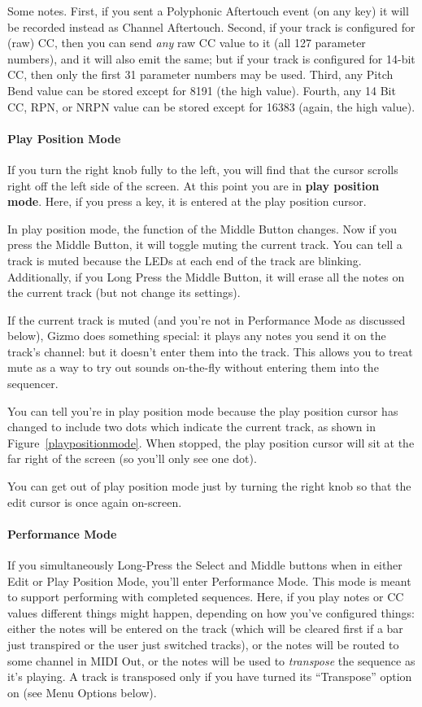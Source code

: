 \documentclass{article}
\begin{document}
Some notes.  First, if you sent a Polyphonic Aftertouch event (on any key) it will be recorded instead as Channel Aftertouch.  Second, if your track is configured for (raw) CC, then you can send {\it any} raw CC value to it (all 127 parameter numbers), and it will also emit the same; but if your track is configured for 14-bit CC, then only the first 31 parameter numbers may be used.  Third, any Pitch Bend value can be stored except for 8191 (the high value).  Fourth, any 14 Bit CC, RPN, or NRPN value can be stored except for 16383 (again, the high value).  

\paragraph{Play Position Mode}

If you turn the right knob fully to the left, you will find that the cursor scrolls right off the left side of the screen.  At this point you are in {\bf play position mode}.  Here, if you press a key, it is entered at the play position cursor.

In play position mode, the function of the Middle Button changes.  Now if you press the Middle Button, it will toggle muting the current track.  You can tell a track is muted because the LEDs at each end of the track are blinking.  Additionally, if you Long Press the Middle Button, it will erase all the notes on the current track (but not change its settings).

If the current track is muted (and you're not in Performance Mode as discussed below), Gizmo does something special: it plays any notes you send it on the track's channel: but it doesn't enter them into the track. This allows you to treat mute as a way to try out sounds on-the-fly without entering them into the sequencer.

You can tell you're in play position mode because the play position cursor has changed to include two dots which indicate the current track, as shown in Figure~\ref{playpositionmode}.  When stopped, the play position cursor will sit at the far right of the screen (so you'll only see one dot).

You can get out of play position mode just by turning the right knob so that the edit cursor is once again on-screen.

\paragraph{Performance Mode} If you simultaneously Long-Press the Select and Middle buttons when in either Edit or Play Position Mode, you'll enter Performance Mode.  This mode is meant to support performing with completed sequences.  Here, if you play notes or CC values different things might happen, depending on how you've configured things: either the notes will be entered on the track (which will be cleared first if a bar just transpired or the user just switched tracks), or the notes will be routed to some channel in MIDI Out, or the notes will be used to {\it transpose} the sequence as it's playing.  A track is transposed only if you have turned its ``Transpose'' option on (see Menu Options below).
\end{document}
